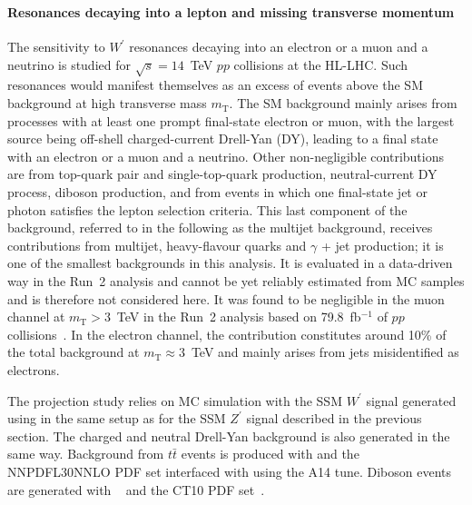 \subsubsection{}


\paragraph*{Resonances decaying into a lepton and missing transverse momentum}

The sensitivity to $W^\prime$ resonances decaying into an electron or a muon and a neutrino is studied
for $\sqrt{s} = 14$~TeV $pp$ collisions at the HL-LHC.
Such resonances would manifest themselves as an excess of events above the SM background at high
transverse mass $m_\mathrm{T}$.
The SM background mainly arises from processes with at least one prompt final-state electron or muon,
with the largest source being off-shell charged-current Drell-Yan (DY),
leading to a final state with an electron or a muon and a neutrino.
Other non-negligible contributions are from top-quark pair and single-top-quark production,
neutral-current DY process, diboson production, and from events in which one
final-state jet or photon satisfies the lepton selection criteria. This last component of the background,
referred to in the following as the multijet background, receives contributions from
multijet, heavy-flavour quarks and $\gamma$ + jet production; it is one of the smallest backgrounds in
this analysis. It is evaluated in a data-driven way in the Run~2 analysis and cannot be yet reliably
estimated from MC samples and is therefore not considered here.
It was found to be negligible in the muon channel at $m_\mathrm{T} > 3$~TeV in the
Run~2 analysis based on 79.8~fb$^{-1}$ of $pp$ collisions~\cite{ATLAS-CONF-2018-017}.
In the electron channel, the contribution constitutes around 10\% of the total background
at $m_\mathrm{T} \approx 3$~TeV and mainly arises from jets misidentified as electrons. 

The projection study relies on MC simulation with the SSM $W^\prime$ signal generated using  in the same setup as for the SSM $Z^\prime$ signal described in the previous section. The charged and neutral Drell-Yan background is also generated in the same way. Background from $t\bar{t}$ events is produced with \powhegbox and the \textsc{NNPDFL30NNLO} PDF set interfaced with  using the A14 tune. Diboson events are generated with \sherpa~\cite{sherpa} and the \textsc{CT10} PDF set~\cite{Lai:2010vv}.

